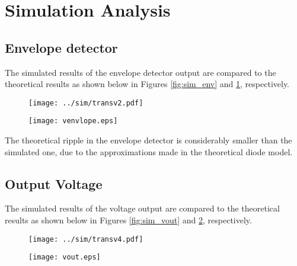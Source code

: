 \section{Simulation Analysis}
\label{sec:simulation}

\subsection{Envelope detector}
The simulated results of the envelope detector output are compared to the theoretical results as shown below in Figures \ref{fig:sim_env} and \ref{fig:theo_env}, respectively.


\begin{figure} [ht]
\centering
\begin{minipage}{.5\textwidth}
  \centering
  \texttt{[image: ../sim/transv2.pdf]}
  \label{fig:sim_env}
\end{minipage}%
\begin{minipage}{.5\textwidth}
  \centering
  \texttt{[image: venvlope.eps]}
  \label{fig:theo_env}
\end{minipage}
\end{figure}

The theoretical ripple in the envelope detector is considerably smaller than the simulated one, due to the approximations made in the theoretical diode model.




\pagebreak
\subsection{Output Voltage}
The simulated results of the voltage output are compared to the theoretical results as shown below in Figures \ref{fig:sim_vout} and \ref{fig:theo_vout}, respectively.

\begin{figure} [h]
\centering
\begin{minipage}{.5\textwidth}
  \centering
  \texttt{[image: ../sim/transv4.pdf]}
  \label{fig:sim_vout}
\end{minipage}%
\begin{minipage}{.5\textwidth}
  \centering
  \texttt{[image: vout.eps]}
  \label{fig:theo_vout}
\end{minipage}
\end{figure}

